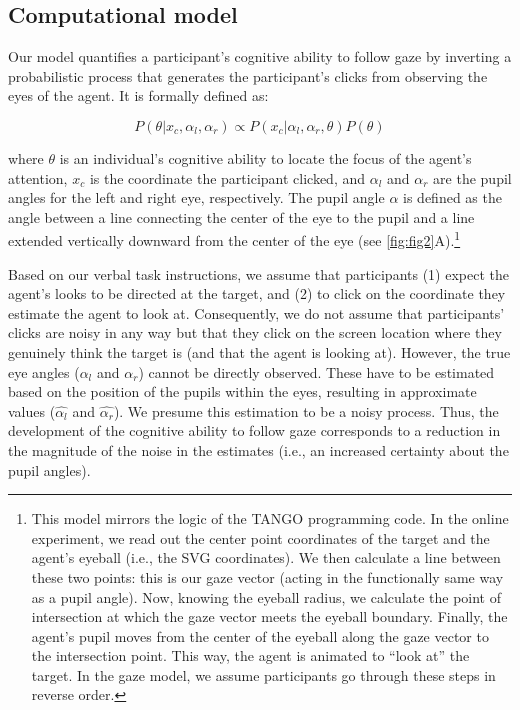 \documentclass[
  man,mask,floatsintext]{apa6}
\begin{document}
\hypertarget{computational-model}{%
\subsection{Computational model}\label{computational-model}}

Our model quantifies a participant's cognitive ability to follow gaze by inverting a probabilistic process that generates the participant's clicks from observing the eyes of the agent. It is formally defined as:

\begin{equation}
    P(\theta | x_c, \alpha_l, \alpha_r) \propto P(x_c | \alpha_l, \alpha_r, \theta)P(\theta)
\end{equation}

where \(\theta\) is an individual's cognitive ability to locate the focus of the agent's attention, \(x_c\) is the coordinate the participant clicked, and \(\alpha_l\) and \(\alpha_r\) are the pupil angles for the left and right eye, respectively. The pupil angle \(\alpha\) is defined as the angle between a line connecting the center of the eye to the pupil and a line extended vertically downward from the center of the eye (see \ref{fig:fig2}A).\footnote{This model mirrors the logic of the TANGO programming code. In the online experiment, we read out the center point coordinates of the target and the agent's eyeball (i.e., the SVG coordinates). We then calculate a line between these two points: this is our gaze vector (acting in the functionally same way as a pupil angle). Now, knowing the eyeball radius, we calculate the point of intersection at which the gaze vector meets the eyeball boundary. Finally, the agent's pupil moves from the center of the eyeball along the gaze vector to the intersection point. This way, the agent is animated to ``look at'' the target. In the gaze model, we assume participants go through these steps in reverse order.}

Based on our verbal task instructions, we assume that participants (1) expect the agent's looks to be directed at the target, and (2) to click on the coordinate they estimate the agent to look at. Consequently, we do not assume that participants' clicks are noisy in any way but that they click on the screen location where they genuinely think the target is (and that the agent is looking at). However, the true eye angles (\(\alpha_l\) and \(\alpha_r\)) cannot be directly observed. These have to be estimated based on the position of the pupils within the eyes, resulting in approximate values (\(\hat{\alpha_l}\) and \(\hat{\alpha_r}\)). We presume this estimation to be a noisy process. Thus, the development of the cognitive ability to follow gaze corresponds to a reduction in the magnitude of the noise in the estimates (i.e., an increased certainty about the pupil angles).
\end{document}
